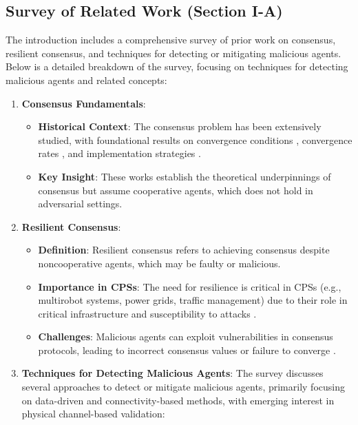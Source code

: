 \documentclass{article}
\begin{document}
\subsection*{Survey of Related Work (Section I-A)}
The introduction includes a comprehensive survey of prior work on consensus, resilient consensus, and techniques for detecting or mitigating malicious agents. Below is a detailed breakdown of the survey, focusing on techniques for detecting malicious agents and related concepts:

\begin{enumerate}
    \item \textbf{Consensus Fundamentals}:
    \begin{itemize}
        \item \textbf{Historical Context}: The consensus problem has been extensively studied, with foundational results on convergence conditions \cite{ref25,ref26,ref27,ref28,ref29}, convergence rates \cite{ref30,ref31,ref32}, and implementation strategies \cite{ref33,ref34}.
        \item \textbf{Key Insight}: These works establish the theoretical underpinnings of consensus but assume cooperative agents, which does not hold in adversarial settings.
    \end{itemize}
    
    \item \textbf{Resilient Consensus}:
    \begin{itemize}
        \item \textbf{Definition}: Resilient consensus refers to achieving consensus despite noncooperative agents, which may be faulty or malicious.
        \item \textbf{Importance in CPSs}: The need for resilience is critical in CPSs (e.g., multirobot systems, power grids, traffic management) due to their role in critical infrastructure and susceptibility to attacks \cite{ref7,ref35,ref36,ref37,ref38,ref39,ref40,ref41,ref42}.
        \item \textbf{Challenges}: Malicious agents can exploit vulnerabilities in consensus protocols, leading to incorrect consensus values or failure to converge \cite{ref1,ref2,ref3,ref4}.
    \end{itemize}
    
    \item \textbf{Techniques for Detecting Malicious Agents}:
    The survey discusses several approaches to detect or mitigate malicious agents, primarily focusing on data-driven and connectivity-based methods, with emerging interest in physical channel-based validation:
    

\end{enumerate}
\end{document}
